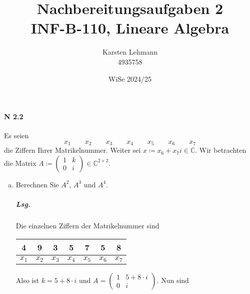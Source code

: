 \documentclass{scrreprt}
\author{Karsten Lehmann \\ 4935758}
\date{WiSe 2024/25}
\title{Nachbereitungsaufgaben 2\\INF-B-110, Lineare Algebra}
\begin{document}
\paragraph{N 2.2} Es seien
\[
  x_1 \qquad x_2 \qquad x_3 \qquad x_4 \qquad x_5 \qquad x_6 \qquad x_7
\]
die Ziffern Ihrer Matrikelnummer.
Weiter sei $x \coloneqq x_6 + x_7i \in \mathbb{C}$.
Wir betrachten die Matrix
$A \coloneqq \begin{pmatrix} 1 & k \\ 0 & i \end{pmatrix} \in \mathbb{C}^{2 \times 2}$.

\begin{enumerate}[(a)]
\item Berechnen Sie $A^2$, $A^3$ und $A^4$.

  \subparagraph{Lsg.} Die einzelnen Ziffern der Matrikelnummer sind

  \begin{tabular}{|c|c|c|c|c|c|c|}
    \hline
    4 & 9 & 3 & 5 & 7 & 5 & 8 \\
    \hline
    $x_1$ & $x_2$ & $x_3$ & $x_4$ & $x_5$ & $x_6$ & $x_7$ \\
    \hline
  \end{tabular}

  Also ist $k = 5 + 8 \cdot i$ und
  $A = \begin{pmatrix} 1 & 5 + 8 \cdot i \\ 0 & i \end{pmatrix}$.
  Nun sind


\end{enumerate}
\end{document}
